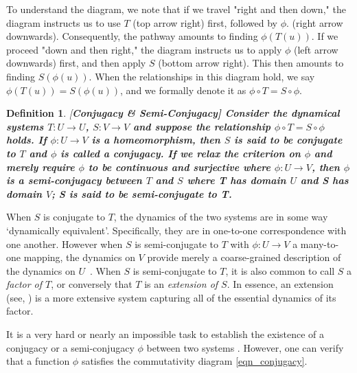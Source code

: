 \documentclass[a4paper,12pt,twoside]{report}
\newtheorem{Definition}{Definition}[]
\begin{document}
To understand the diagram, we note that if we travel "right and then down," the diagram instructs us to use $T$ (top arrow right) first, followed by $\phi$. (right arrow downwards). Consequently, the pathway amounts to finding $\phi(T(u))$. If we proceed "down and then right," the diagram instructs us to apply $\phi$ (left arrow downwards) first, and then apply $S$ (bottom arrow right). This then amounts to finding  $S(\phi(u))$. When the relationships in this diagram hold, we say $\phi(T(u))= S(\phi(u))$, and we formally denote it as $\phi \circ T=S\circ \phi$.

\begin{Definition}\rm  
[\bf {Conjugacy \& Semi-Conjugacy}]\label{Dfn_Conjugate}\rm
   Consider the dynamical systems $T:U\to{U}$, $S:V\to{V}$ and suppose the relationship $\phi \circ T=S\circ \phi$ holds. If $\phi:U\to{V}$ is a homeomorphism, then $S$ is said to be conjugate to $T$ and $\phi$ is called a conjugacy. If we relax the criterion on $\phi$ and merely require $\phi$ to be continuous and surjective where $\phi:U\to{V}$, then $\phi$ is a semi-conjugacy between $T$ and $S$ where T has domain $U$ and S has domain $V$; S is said to be semi-conjugate to T. 
\end{Definition} 

When $S$ is conjugate to $T$, the dynamics of the two systems are in some way `dynamically equivalent'. Specifically, they are in one-to-one correspondence with one another. However when $S$ is semi-conjugate to $T$ with $\phi:U\to{V}$ a many-to-one mapping, the dynamics on $V$ provide merely a coarse-grained description of the dynamics on $U$~\cite{de2013elements}. When $S$ is semi-conjugate to $T$, it is also common to call $S$ a \emph{factor of $T$}, or conversely that $T$ is an \emph{extension of $S$}. In essence, an extension (see, \cite{de2013elements}) is a more extensive system capturing all of the essential dynamics of its factor.

It is a very hard or nearly an impossible task to establish the existence of a conjugacy or a semi-conjugacy $\phi$ between two systems \cite{devaney2018introduction}. However, one can verify that a function $\phi$ satisfies the commutativity diagram \ref{eqn_conjugacy}.  
\end{document}
